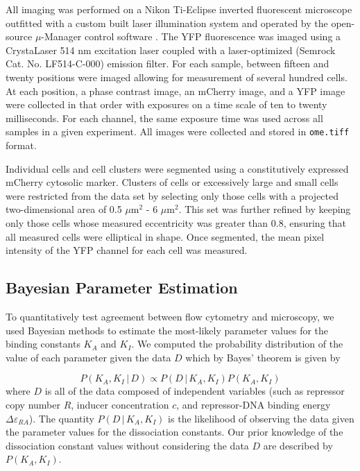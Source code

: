 \documentclass[letterpaper, 10pt]{article}
\begin{document}
All imaging was performed on a Nikon Ti-Eclipse inverted fluorescent microscope
outfitted with a custom built laser illumination system and operated by the
open-source $\mu$-Manager control software \cite{Edelstein2014}. The YFP
fluorescence was imaged using a CrystaLaser 514 nm excitation laser coupled
with a laser-optimized (Semrock Cat. No. LF514-C-000) emission filter. For each
sample, between fifteen and twenty positions were imaged allowing for
measurement of several hundred cells. At each position, a phase contrast image,
an mCherry image, and a YFP image were collected in that order with exposures
on a time scale of ten to twenty milliseconds. For each channel, the same
exposure time was used across all samples in a given experiment. All images
were collected and stored in \texttt{ome.tiff} format.

Individual cells and cell clusters were segmented using a constitutively
expressed mCherry cytosolic marker. Clusters of cells or excessively large
and small cells were restricted from the data set by selecting only those cells
with a projected two-dimensional area of 0.5 $\mu$m$^2$ - 6 $\mu$m$^2$. This set
was further refined by keeping only those cells whose measured eccentricity was
greater than 0.8, ensuring that all measured cells were elliptical in shape.
Once segmented, the mean pixel intensity of the YFP channel for each cell was
measured.

\subsection*{Bayesian Parameter Estimation}
To quantitatively test agreement between flow cytometry and microscopy, we
used Bayesian methods to estimate the most-likely parameter values for the
binding constants $K_A$ and $K_I$. We computed the probability distribution of
the value of each parameter given the data $D$ which by Bayes' theorem is given
by

\begin{equation}
  P(K_A, K_I \, \vert \, D) \propto P(D\, \vert \, K_A, K_I)P(K_A, K_I)
  \label{eq:bayes_thm}
\end{equation}
where $D$ is all of the data composed of independent variables (such as repressor
copy number $R$, inducer concentration $c$, and repressor-DNA binding energy $\Delta\varepsilon_{RA}$).
The quantity $P(D\, \vert \, K_A, K_I)$ is the likelihood of observing the
data given the parameter values for the dissociation constants. Our
prior knowledge of the dissociation constant values without considering the data $D$
are described by $P(K_A, K_I)$.
\end{document}
